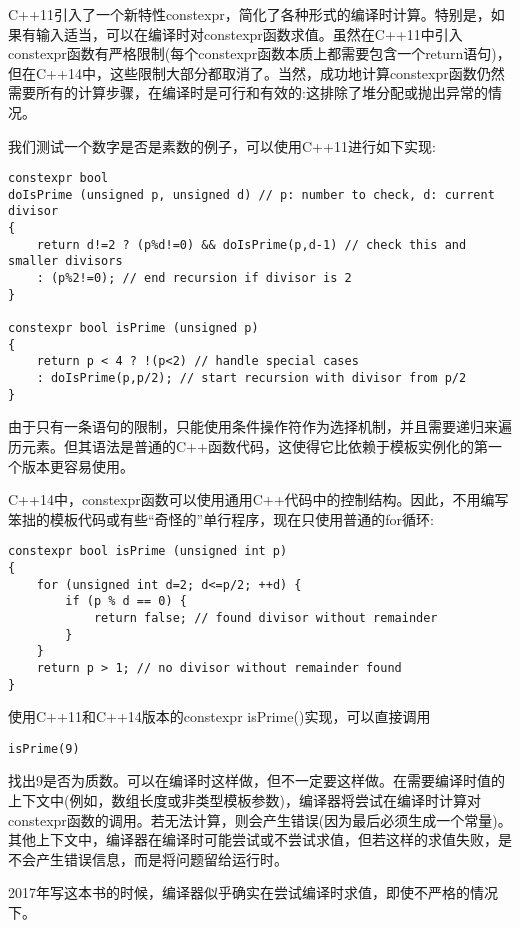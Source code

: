 C++11引入了一个新特性constexpr，简化了各种形式的编译时计算。特别是，如果有输入适当，可以在编译时对constexpr函数求值。虽然在C++11中引入constexpr函数有严格限制(每个constexpr函数本质上都需要包含一个return语句)，但在C++14中，这些限制大部分都取消了。当然，成功地计算constexpr函数仍然需要所有的计算步骤，在编译时是可行和有效的:这排除了堆分配或抛出异常的情况。

我们测试一个数字是否是素数的例子，可以使用C++11进行如下实现:

\begin{lstlisting}[style=styleCXX]
constexpr bool
doIsPrime (unsigned p, unsigned d) // p: number to check, d: current divisor
{
	return d!=2 ? (p%d!=0) && doIsPrime(p,d-1) // check this and smaller divisors
	: (p%2!=0); // end recursion if divisor is 2
}

constexpr bool isPrime (unsigned p)
{
	return p < 4 ? !(p<2) // handle special cases
	: doIsPrime(p,p/2); // start recursion with divisor from p/2
}
\end{lstlisting}

由于只有一条语句的限制，只能使用条件操作符作为选择机制，并且需要递归来遍历元素。但其语法是普通的C++函数代码，这使得它比依赖于模板实例化的第一个版本更容易使用。

C++14中，constexpr函数可以使用通用C++代码中的控制结构。因此，不用编写笨拙的模板代码或有些“奇怪的”单行程序，现在只使用普通的for循环:

\begin{lstlisting}[style=styleCXX]
constexpr bool isPrime (unsigned int p)
{
	for (unsigned int d=2; d<=p/2; ++d) {
		if (p % d == 0) {
			return false; // found divisor without remainder
		}
	}
	return p > 1; // no divisor without remainder found
}
\end{lstlisting}

使用C++11和C++14版本的constexpr isPrime()实现，可以直接调用

\begin{lstlisting}[style=styleCXX]
isPrime(9)
\end{lstlisting}

找出9是否为质数。可以在编译时这样做，但不一定要这样做。在需要编译时值的上下文中(例如，数组长度或非类型模板参数)，编译器将尝试在编译时计算对constexpr函数的调用。若无法计算，则会产生错误(因为最后必须生成一个常量)。其他上下文中，编译器在编译时可能尝试或不尝试求值，但若这样的求值失败，是不会产生错误信息，而是将问题留给运行时。

\begin{tcolorbox}[colback=webgreen!5!white,colframe=webgreen!75!black]
\hspace*{0.75cm}2017年写这本书的时候，编译器似乎确实在尝试编译时求值，即使不严格的情况下。
\end{tcolorbox}

